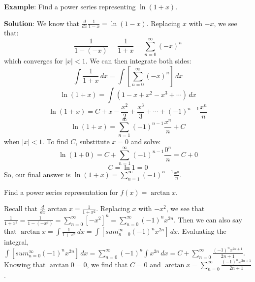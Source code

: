 \textbf{Example}: Find a power series representing $\ln{(1+x)}$. 

\textbf{Solution}: We know that $\frac{d}{dx} \frac{1}{1-x} = \ln{(1-x)}$. 
Replacing $x$ with $-x$, we see that:
$$\frac{1}{1-(-x)} = \frac{1}{1+x} = \sum_{n=0}^\infty (-x)^n$$
which converges for $|x| < 1$. We can then integrate both sides:
$$\int \frac{1}{1+x}\,dx = \int \left[ \sum_{n=0}^\infty (-x)^n \right] \,dx$$
$$\ln{(1 + x)} = \int \left( 1 - x + x^2 - x^3 + \cdots \right)\,dx $$
$$\ln{(1 + x)} = C + x - \frac{x^2}{2} + \frac{x^3}{3} + \cdots + (-1)^{n-1} \frac{x^n}{n}$$
$$\ln{(1 + x)} = \sum_{n=1}^\infty (-1)^{n-1} \frac{x^n}{n} + C$$
when $|x|<1$. To find $C$, substitute $x = 0$ and solve:
$$\ln{(1 + 0)} = C + \sum_{n=1}^\infty (-1)^{n-1} \frac{0^n}{n} = C + 0$$
$$C = \ln{1} = 0$$
So, our final answer is $\ln{(1 + x)} = \sum_{n=1}^\infty (-1)^{n-1} \frac{x^n}{
n}$. 

\begin{Exercise}[label = seriescalc1]
Find a power series representation for $f(x) = \arctan{x}$. 
\end{Exercise}

\begin{Answer}[ref = seriescalc1]
Recall that $\frac{d}{dx} \arctan{x} = \frac{1}{1+x^2}$. Replacing $x$ with 
$-x^2$, we see that $\frac{1}{1 + x^2} = \frac{1}{1- (-x^2)} = \sum_{n=0}^
\infty \left[ -x^2 \right]^n = \sum_{n=0}^\infty (-1)^n x^{2n}$. Then we can 
also say that $\arctan{x} = \int \frac{1}{1 + x^2}\,dx = \int \left[ sum_{n=0}
^\infty (-1)^n x^{2n} \right]\,dx$. Evaluating the integral, $\int \left[ sum_
{n=0}^\infty (-1)^n x^{2n} \right]\,dx = \sum_{n=0}^\infty (-1)^n \int 
x^{2n}\,dx = C + \sum_{n=0}^\infty \frac{(-1)^n x^{2n+1}}{2n+1}$. Knowing that 
$\arctan{0} = 0$, we find that $C = 0$ and $\arctan{x} = \sum_{n=0}^\infty 
\frac{(-1)^n x^{2n+1}}{2n+1}$. 
\end{Answer}